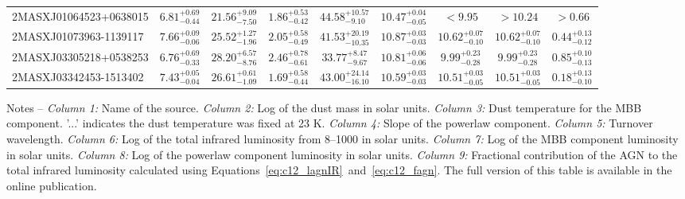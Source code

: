 \documentclass[fleqn, usenatbib]{mnras}
\begin{document}
\begin{table}
\begin{threeparttable}
\begin{tabular}{lcccccccc}
2MASXJ01064523+0638015 & $6.81_{-0.44}^{+0.69}$ & $21.56_{-7.50}^{+9.09}$ & $1.86_{-0.42}^{+0.53}$ &$44.58_{-9.10}^{+10.57}$ & $10.47_{-0.05}^{+0.04}$ & $<9.95$ & $>10.24$ & $>0.66$ \\
2MASXJ01073963-1139117 & $7.66_{-0.06}^{+0.09}$ & $25.52_{-1.96}^{+1.27}$ & $2.05_{-0.49}^{+0.58}$ &$41.53_{-10.35}^{+20.19}$ & $10.87_{-0.03}^{+0.03}$ & $10.62_{-0.10}^{+0.07}$ & $10.62_{-0.10}^{+0.07}$ & $0.44_{-0.12}^{+0.13}$ \\
2MASXJ03305218+0538253 & $6.76_{-0.33}^{+0.69}$ & $28.20_{-8.76}^{+6.57}$ & $2.46_{-0.61}^{+0.78}$ &$33.77_{-9.67}^{+8.47}$ & $10.81_{-0.06}^{+0.06}$ & $9.99_{-0.28}^{+0.23}$ & $9.99_{-0.28}^{+0.23}$ & $0.85_{-0.13}^{+0.10}$ \\
2MASXJ03342453-1513402 & $7.43_{-0.04}^{+0.05}$ & $26.61_{-1.09}^{+0.61}$ & $1.69_{-0.44}^{+0.58}$ &$43.00_{-16.10}^{+24.14}$ & $10.59_{-0.03}^{+0.03}$ & $10.51_{-0.05}^{+0.03}$ & $10.51_{-0.05}^{+0.03}$ & $0.18_{-0.10}^{+0.13}$ \\\bottomrule
\end{tabular}
\begin{tablenotes}
\item Notes -- \textit{Column 1:} Name of the source. \textit{Column 2:} Log of the dust mass in solar units. \textit{Column 3:} Dust temperature for the MBB component. '...' indicates the dust temperature was fixed at 23 K. \textit{Column 4:} Slope of the powerlaw component. \textit{Column 5:} Turnover wavelength. \textit{Column 6:} Log of the total infrared luminosity from 8--1000 \micron{} in solar units. \textit{Column 7:} Log of the MBB component luminosity in solar units. \textit{Column 8:} Log of the powerlaw component luminosity in solar units. \textit{Column 9:} Fractional contribution of the AGN to the total infrared luminosity calculated using Equations~\ref{eq:c12_lagnIR}~and~\ref{eq:c12_fagn}. The full version of this table is available in the online publication.
\end{tablenotes}
\end{threeparttable}
\end{table}
\end{document}
